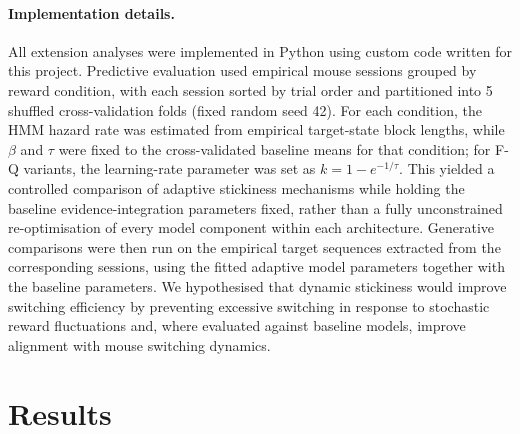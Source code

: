 \documentclass[11pt, reprint, aps, prl]{revtex4-2}
\begin{document}
\paragraph{\textbf{Implementation details.}}
All extension analyses were implemented in Python using custom code written for this project. Predictive evaluation used empirical mouse sessions grouped by reward condition, with each session sorted by trial order and partitioned into 5 shuffled cross-validation folds (fixed random seed 42). For each condition, the HMM hazard rate was estimated from empirical target-state block lengths, while $\beta$ and $\tau$ were fixed to the cross-validated baseline means for that condition; for F-Q variants, the learning-rate parameter was set as $k = 1 - e^{-1/\tau}$. This yielded a controlled comparison of adaptive stickiness mechanisms while holding the baseline evidence-integration parameters fixed, rather than a fully unconstrained re-optimisation of every model component within each architecture. Generative comparisons were then run on the empirical target sequences extracted from the corresponding sessions, using the fitted adaptive model parameters together with the baseline parameters. We hypothesised that dynamic stickiness would improve switching efficiency by preventing excessive switching in response to stochastic reward fluctuations and, where evaluated against baseline models, improve alignment with mouse switching dynamics.


\section{Results}
\end{document}
